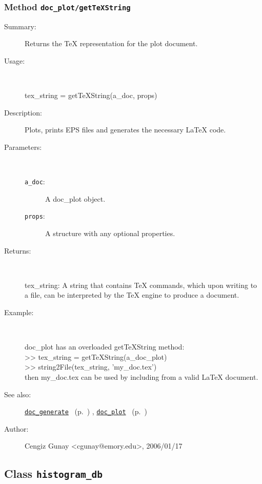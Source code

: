 \subsubsection[Method \texttt{getTeXString}]{Method \texttt{doc\_plot/getTeXString}}%
%
\label{ref_doc_plot__getTeXString}%
\hypertarget{ref_doc_plot__getTeXString}{}%
\begin{description}
\item[Summary:]Returns the TeX representation for the plot document.
%
\item[Usage:]~%
\begin{lyxcode}%
tex\_string = getTeXString(a\_doc, props)
%
\end{lyxcode}%
%
\item[Description:]%
Plots, prints EPS files and generates the necessary LaTeX code.
\item[Parameters:]~
\begin{description}%
\item[\texttt{a\_doc}:]
 A doc\_plot object.
\item[\texttt{props}:]
 A structure with any optional properties.
\end{description}%
%
\item[Returns:]~

	tex\_string: A string that contains TeX commands, which upon writing to a file,
	  can be interpreted by the TeX engine to produce a document.
%
\item[Example:]~
\begin{lyxcode}        doc\_plot has an overloaded getTeXString method:\\%
        >> tex\_string = getTeXString(a\_doc\_plot)\\%
        >> string2File(tex\_string, 'my\_doc.tex')\\%
        then my\_doc.tex can be used by including from a valid LaTeX document.\\%
\end{lyxcode}
%
\item[See also:]%
\hyperlink{ref_doc_generate}{\texttt{doc\_generate}}%
\ (p.~\pageref{ref_doc_generate})%
%
, \hyperlink{ref_doc_plot}{\texttt{doc\_plot}}%
\ (p.~\pageref{ref_doc_plot})%
%
%
\item[Author:]%
Cengiz Gunay <cgunay@emory.edu>, 2006/01/17%
\end{description}
\methodline%
\subsection{Class \texttt{histogram\_db}}%
%
\label{ref_histogram_db}%
\hypertarget{ref_histogram_db}{}%
